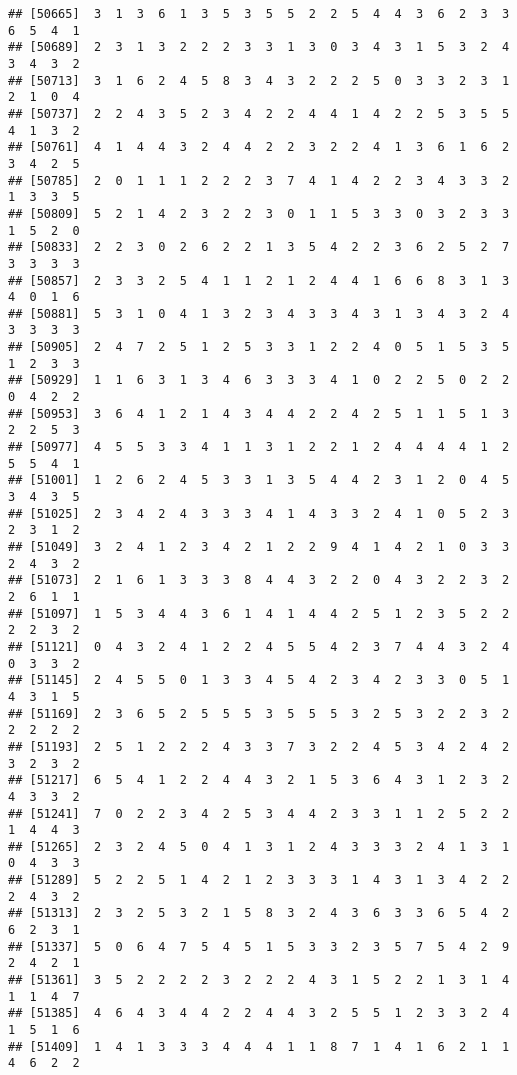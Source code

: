 \documentclass[
]{article}
\begin{document}
\begin{verbatim}
## [50665]  3  1  3  6  1  3  5  3  5  5  2  2  5  4  4  3  6  2  3  3  6  5  4  1
## [50689]  2  3  1  3  2  2  2  3  3  1  3  0  3  4  3  1  5  3  2  4  3  4  3  2
## [50713]  3  1  6  2  4  5  8  3  4  3  2  2  2  5  0  3  3  2  3  1  2  1  0  4
## [50737]  2  2  4  3  5  2  3  4  2  2  4  4  1  4  2  2  5  3  5  5  4  1  3  2
## [50761]  4  1  4  4  3  2  4  4  2  2  3  2  2  4  1  3  6  1  6  2  3  4  2  5
## [50785]  2  0  1  1  1  2  2  2  3  7  4  1  4  2  2  3  4  3  3  2  1  3  3  5
## [50809]  5  2  1  4  2  3  2  2  3  0  1  1  5  3  3  0  3  2  3  3  1  5  2  0
## [50833]  2  2  3  0  2  6  2  2  1  3  5  4  2  2  3  6  2  5  2  7  3  3  3  3
## [50857]  2  3  3  2  5  4  1  1  2  1  2  4  4  1  6  6  8  3  1  3  4  0  1  6
## [50881]  5  3  1  0  4  1  3  2  3  4  3  3  4  3  1  3  4  3  2  4  3  3  3  3
## [50905]  2  4  7  2  5  1  2  5  3  3  1  2  2  4  0  5  1  5  3  5  1  2  3  3
## [50929]  1  1  6  3  1  3  4  6  3  3  3  4  1  0  2  2  5  0  2  2  0  4  2  2
## [50953]  3  6  4  1  2  1  4  3  4  4  2  2  4  2  5  1  1  5  1  3  2  2  5  3
## [50977]  4  5  5  3  3  4  1  1  3  1  2  2  1  2  4  4  4  4  1  2  5  5  4  1
## [51001]  1  2  6  2  4  5  3  3  1  3  5  4  4  2  3  1  2  0  4  5  3  4  3  5
## [51025]  2  3  4  2  4  3  3  3  4  1  4  3  3  2  4  1  0  5  2  3  2  3  1  2
## [51049]  3  2  4  1  2  3  4  2  1  2  2  9  4  1  4  2  1  0  3  3  2  4  3  2
## [51073]  2  1  6  1  3  3  3  8  4  4  3  2  2  0  4  3  2  2  3  2  2  6  1  1
## [51097]  1  5  3  4  4  3  6  1  4  1  4  4  2  5  1  2  3  5  2  2  2  2  3  2
## [51121]  0  4  3  2  4  1  2  2  4  5  5  4  2  3  7  4  4  3  2  4  0  3  3  2
## [51145]  2  4  5  5  0  1  3  3  4  5  4  2  3  4  2  3  3  0  5  1  4  3  1  5
## [51169]  2  3  6  5  2  5  5  5  3  5  5  5  3  2  5  3  2  2  3  2  2  2  2  2
## [51193]  2  5  1  2  2  2  4  3  3  7  3  2  2  4  5  3  4  2  4  2  3  2  3  2
## [51217]  6  5  4  1  2  2  4  4  3  2  1  5  3  6  4  3  1  2  3  2  4  3  3  2
## [51241]  7  0  2  2  3  4  2  5  3  4  4  2  3  3  1  1  2  5  2  2  1  4  4  3
## [51265]  2  3  2  4  5  0  4  1  3  1  2  4  3  3  3  2  4  1  3  1  0  4  3  3
## [51289]  5  2  2  5  1  4  2  1  2  3  3  3  1  4  3  1  3  4  2  2  2  4  3  2
## [51313]  2  3  2  5  3  2  1  5  8  3  2  4  3  6  3  3  6  5  4  2  6  2  3  1
## [51337]  5  0  6  4  7  5  4  5  1  5  3  3  2  3  5  7  5  4  2  9  2  4  2  1
## [51361]  3  5  2  2  2  2  3  2  2  2  4  3  1  5  2  2  1  3  1  4  1  1  4  7
## [51385]  4  6  4  3  4  4  2  2  4  4  3  2  5  5  1  2  3  3  2  4  1  5  1  6
## [51409]  1  4  1  3  3  3  4  4  4  1  1  8  7  1  4  1  6  2  1  1  4  6  2  2

\end{verbatim}
\end{document}
